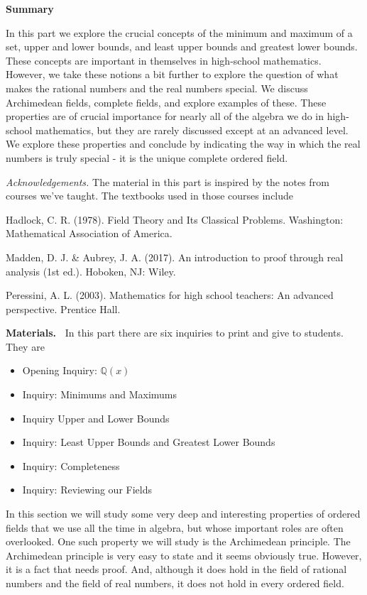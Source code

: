 \documentclass[11pt]{article}
\newcommand\header[1]{\vspace*{4pt}\par {\large {\bf #1}}\par}
\newenvironment{bignote}[1][Instructor note]%
	{\begin{mdframed}\raggedright{\bf #1.~}}
	{\end{mdframed}}
\theoremstyle{definition}
\begin{document}
\header{Summary}

In this part we explore the crucial concepts of the minimum and maximum of a set,
upper and lower bounds, and least upper bounds and greatest lower bounds. These concepts are important
in themselves in high-school mathematics. However, we take these notions a bit further to explore
the question of what makes the rational numbers and the real numbers special.
We discuss Archimedean fields, complete fields, and explore examples of these. These properties are
of crucial importance for nearly all of the algebra we do in high-school mathematics, but they are rarely
discussed except at an advanced level. We explore these properties and conclude by indicating the way in
which the real numbers is truly special - it is the unique complete ordered field.

{\it Acknowledgements.}  The material in this part is inspired by the notes from courses we've taught. The textbooks used in those courses include

Hadlock, C. R. (1978). Field Theory and Its Classical Problems. Washington: Mathematical Association of America.

Madden, D. J. \& Aubrey, J. A. (2017). An introduction to proof through real analysis (1st ed.). Hoboken, NJ: Wiley.

Peressini, A. L. (2003). Mathematics for high school teachers: An advanced perspective. Prentice Hall.

\newpage
\begin{bignote}[Materials]
  In this part there are six inquiries to print and give to students. They are
\begin{itemize}
  \item Opening Inquiry: $\mathbb{Q}(x)$
  \item Inquiry: Minimums and Maximums
  \item Inquiry Upper and Lower Bounds
  \item Inquiry: Least Upper Bounds and Greatest Lower Bounds
  \item Inquiry: Completeness
  \item Inquiry: Reviewing our Fields
\end{itemize}
\end{bignote}

In this section we will study some very deep and interesting properties of ordered fields that we use all the time in algebra, but whose important roles are often overlooked. One such
property we will study is the Archimedean principle. The Archimedean principle is very easy to state and it seems obviously true. However, it is a fact that needs proof. And, 
although it does hold in the field of rational numbers and the field of real numbers, it does not hold in every ordered field. 
\end{document}
